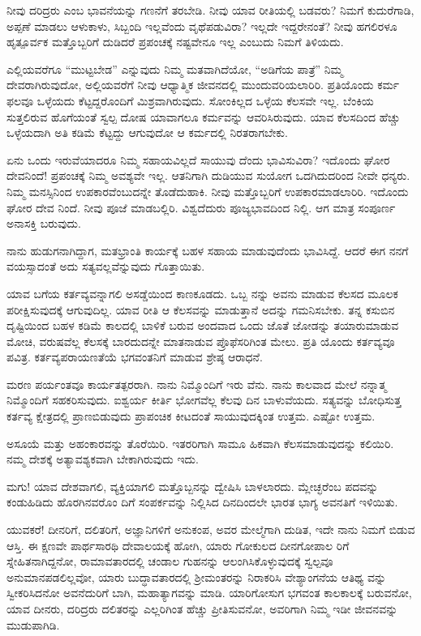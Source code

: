ನೀವು ದರಿದ್ರರು ಎಂಬ ಭಾವನೆಯನ್ನು ಗಣನೆಗೆ ತರಬೇಡಿ. ನೀವು ಯಾವ ರೀತಿಯಲ್ಲಿ ಬಡವರು? ನಿಮಗೆ ಕುದುರೆಗಾಡಿ, ಅಪ್ಪಣೆ ಮಾಡಲು ಆಳುಕಾಳು, ಸಿಬ್ಬಂದಿ ಇಲ್ಲವೆಂದು ವೃಥೆಪಡುವಿರಾ? ಇಲ್ಲದೇ ಇದ್ದರೇನಂತೆ? ನೀವು ಹಗಲಿರಳೂ ಹೃತ್ಪೂರ್ವಕ ಮತ್ತೊಬ್ಬರಿಗೆ ದುಡಿದರೆ ಪ್ರಪಂಚಕ್ಕೆ ನಷ್ಟವೇನೂ ಇಲ್ಲ ಎಂಬುದು ನಿಮಗೆ ತಿಳಿಯದು.

ಎಲ್ಲಿಯವರೆಗೂ “ಮುಟ್ಟಬೇಡ” ಎನ್ನುವುದು ನಿಮ್ಮ ಮತವಾಗಿದೆಯೋ, “ಅಡಿಗೆಯ ಪಾತ್ರೆ” ನಿಮ್ಮ ದೇವರಾಗಿರುವುದೋ, ಅಲ್ಲಿಯವರೆಗೆ ನೀವು ಆಧ್ಯಾತ್ಮಿಕ ಜೀವನದಲ್ಲಿ ಮುಂದುವರಿಯಲಾರಿರಿ. ಪ್ರತಿಯೊಂದು ಕರ್ಮ ಫಲವೂ ಒಳ್ಳೆಯದು ಕೆಟ್ಟದ್ದರೊಂದಿಗೆ ಮಿಶ್ರವಾಗಿರುವುದು. ಸೋಂಕಿಲ್ಲದ ಒಳ್ಳೆಯ ಕೆಲಸವೇ ಇಲ್ಲ. ಬೆಂಕಿಯ ಸುತ್ತಲಿರುವ ಹೊಗೆಯಂತೆ ಸ್ವಲ್ಪ ದೋಷ ಯಾವಾಗಲೂ ಕರ್ಮವನ್ನು ಆವರಿಸಿರುವುದು. ಯಾವ ಕೆಲಸದಿಂದ ಹೆಚ್ಚು ಒಳ್ಳೆಯದಾಗಿ ಅತಿ ಕಡಿಮೆ ಕೆಟ್ಟದ್ದು ಆಗುವುದೋ ಆ ಕರ್ಮದಲ್ಲಿ ನಿರತರಾಗಬೇಕು.

ಏನು ಒಂದು ಇರುವೆಯಾದರೂ ನಿಮ್ಮ ಸಹಾಯವಿಲ್ಲದೆ ಸಾಯುವು ದೆಂದು ಭಾವಿಸುವಿರಾ? ಇದೊಂದು ಘೋರ ದೇವನಿಂದೆ! ಪ್ರಪಂಚಕ್ಕೆ ನಿಮ್ಮ ಅವಶ್ಯವೇ ಇಲ್ಲ. ಆತನಿಗಾಗಿ ದುಡಿಯುವ ಸುಯೋಗ ಒದಗಿದುದರಿಂದ ನೀವೇ ಧನ್ಯರು. ನಿಮ್ಮ ಮನಸ್ಸಿನಿಂದ ಉಪಕಾರವೆಂಬುದನ್ನೇ ತೊಡೆದುಹಾಕಿ. ನೀವು ಮತ್ತೊಬ್ಬರಿಗೆ ಉಪಕಾರಮಾಡಲಾರಿರಿ. ಇದೊಂದು ಘೋರ ದೇವ ನಿಂದೆ. ನೀವು ಪೂಜೆ ಮಾಡಬಲ್ಲಿರಿ. ವಿಶ್ವದೆದುರು ಪೂಜ್ಯಭಾವದಿಂದ ನಿಲ್ಲಿ. ಆಗ ಮಾತ್ರ ಸಂಪೂರ್ಣ ಅನಾಸಕ್ತಿ ಬರುವುದು.

ನಾನು ಹುಡುಗನಾಗಿದ್ದಾಗ, ಮತಭ್ರಾಂತಿ ಕಾರ್ಯಕ್ಕೆ ಬಹಳ ಸಹಾಯ ಮಾಡುವುದೆಂದು ಭಾವಿಸಿದ್ದೆ. ಆದರೆ ಈಗ ನನಗೆ ವಯಸ್ಸಾದಂತೆ ಅದು ಸತ್ಯವಲ್ಲವೆನ್ನುವುದು ಗೊತ್ತಾಯಿತು.

ಯಾವ ಬಗೆಯ ಕರ್ತವ್ಯವನ್ನಾಗಲಿ ಅಸಡ್ಡೆಯಿಂದ ಕಾಣಕೂಡದು. ಒಬ್ಬ ನನ್ನು ಅವನು ಮಾಡುವ ಕೆಲಸದ ಮೂಲಕ ಪರೀಕ್ಷಿಸುವುದಕ್ಕೆ ಆಗುವುದಿಲ್ಲ. ಯಾವ ರೀತಿ ಆ ಕೆಲಸವನ್ನು ಮಾಡುತ್ತಾನೆ ಅದನ್ನು ಗಮನಿಸಬೇಕು. ತನ್ನ ಕಸುಬಿನ ದೃಷ್ಟಿಯಿಂದ ಬಹಳ ಕಡಿಮೆ ಕಾಲದಲ್ಲಿ ಬಾಳಿಕೆ ಬರುವ ಅಂದವಾದ ಒಂದು ಜೊತೆ ಜೋಡನ್ನು ತಯಾರುಮಾಡುವ ಮೋಚಿ, ವರುಷವೆಲ್ಲ ಕೆಲಸಕ್ಕೆ ಬಾರದುದನ್ನೇ ಮಾತನಾಡುವ ಪ್ರೊಫೆಸರಿಗಿಂತ ಮೇಲು. ಪ್ರತಿ ಯೊಂದು ಕರ್ತವ್ಯವೂ ಪವಿತ್ರ. ಕರ್ತವ್ಯಪರಾಯಣತೆಯೆ ಭಗವಂತನಿಗೆ ಮಾಡುವ ಶ್ರೇಷ್ಠ ಆರಾಧನೆ.

ಮರಣ ಪರ್ಯಂತವೂ ಕಾರ್ಯತತ್ಪರರಾಗಿ. ನಾನು ನಿಮ್ಮೊಂದಿಗೆ ಇರು ವೆನು. ನಾನು ಕಾಲವಾದ ಮೇಲೆ ನನ್ನಾತ್ಮ ನಿಮ್ಮೊಂದಿಗೆ ಸಹಕರಿಸುವುದು. ಐಶ್ವರ್ಯ ಕೀರ್ತಿ ಭೋಗವೆಲ್ಲ ಕೆಲವು ದಿನ ಬಾಳುವೆಯದು. ಸತ್ಯವನ್ನು ಬೋಧಿಸುತ್ತ ಕರ್ತವ್ಯ ಕ್ಷೇತ್ರದಲ್ಲಿ ಪ್ರಾಣಬಿಡುವುದು ಪ್ರಾಪಂಚಿಕ ಕೀಟದಂತೆ ಸಾಯುವುದಕ್ಕಿಂತ ಉತ್ತಮ. ಎಷ್ಟೋ ಉತ್ತಮ.

ಅಸೂಯೆ ಮತ್ತು ಅಹಂಕಾರವನ್ನು ತೊರೆಯಿರಿ. ಇತರರಿಗಾಗಿ ಸಾಮೂ ಹಿಕವಾಗಿ ಕೆಲಸಮಾಡುವುದನ್ನು ಕಲಿಯಿರಿ. ನಮ್ಮ ದೇಶಕ್ಕೆ ಅತ್ಯಾವಶ್ಯಕವಾಗಿ ಬೇಕಾಗಿರುವುದು ಇದು.

ಮಗು! ಯಾವ ದೇಶವಾಗಲಿ, ವ್ಯಕ್ತಿಯಾಗಲಿ ಮತ್ತೊಬ್ಬನನ್ನು ದ್ವೇಷಿಸಿ ಬಾಳಲಾರದು. ಮ್ಲೇಚ್ಛರೆಂಬ ಪದವನ್ನು ಕಂಡುಹಿಡಿದು ಹೊರಗಿನವರೊಂ ದಿಗೆ ಸಂಪರ್ಕವನ್ನು ನಿಲ್ಲಿಸಿದ ದಿನದಿಂದಲೇ ಭಾರತ ಭಾಗ್ಯ ಅವನತಿಗೆ ಇಳಿಯಿತು.

ಯುವಕರೆ! ದೀನರಿಗೆ, ದಲಿತರಿಗೆ, ಅಜ್ಞಾನಿಗಳಿಗೆ ಅನುಕಂಪ, ಅವರ ಮೇಲ್ಮೆಗಾಗಿ ದುಡಿತ, ಇದೇ ನಾನು ನಿಮಗೆ ಬಿಡುವ ಆಸ್ತಿ. ಈ ಕ್ಷಣವೇ ಪಾರ್ಥಸಾರಥಿ ದೇವಾಲಯಕ್ಕೆ ಹೋಗಿ, ಯಾರು ಗೋಕುಲದ ದೀನಗೋಪಾಲ ರಿಗೆ ಸ್ನೇಹಿತನಾಗಿದ್ದನೋ, ರಾಮಾವತಾರದಲ್ಲಿ ಚಂಡಾಲ ಗುಹನನ್ನು ಆಲಂಗಿಸಿಕೊಳ್ಳುವುದಕ್ಕೆ ಸ್ವಲ್ಪವೂ ಅನುಮಾನಪಡಲಿಲ್ಲವೋ, ಯಾರು ಬುದ್ಧಾವತಾರದಲ್ಲಿ ಶ್ರೀಮಂತರನ್ನು ನಿರಾಕರಿಸಿ ವೇಶ್ಯಾಂಗನೆಯ ಆತಿಥ್ಯ ವನ್ನು ಸ್ವೀಕರಿಸಿದನೋ ಅವನೆದುರಿಗೆ ಬಾಗಿ, ಮಹಾತ್ಯಾಗವನ್ನು ಮಾಡಿ. ಯಾರಿಗೋಸುಗ ಭಗವಂತ ಕಾಲಕಾಲಕ್ಕೆ ಬರುವನೋ, ಯಾವ ದೀನರು, ದರಿದ್ರರು ದಲಿತರನ್ನು ಎಲ್ಲರಿಗಿಂತ ಹೆಚ್ಚು ಪ್ರೀತಿಸುವನೋ, ಅವರಿಗಾಗಿ ನಿಮ್ಮ ಇಡೀ ಜೀವನವನ್ನು ಮುಡುಪಾಗಿಡಿ.

